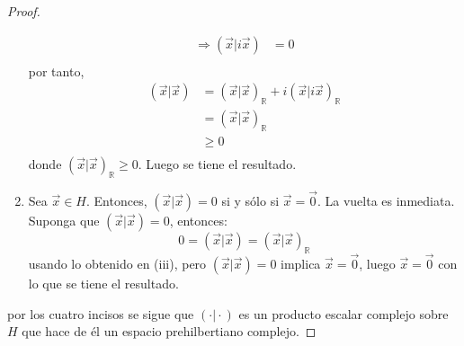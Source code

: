 \documentclass[12pt]{report}
\newcounter{it}
\theoremstyle{largebreak}
\newcommand\pint[2]{\ensuremath{\left(#1\big|#2\right)}}
\begin{document}
\begin{proof}
\begin{enumerate}
\begin{equation*}
\begin{split}
                    \Rightarrow \pint{\vec{x}}{i\vec{x}} &=0\\
                \end{split}
            \end{equation*}
            por tanto,
            \begin{equation*}
                \begin{split}
                    \pint{\vec{x}}{\vec{x}}&=\pint{\vec{x}}{\vec{x}}_{\mathbb{R}}+i\pint{\vec{x}}{i\vec{x}}_{\mathbb{R}}\\
                    &=\pint{\vec{x}}{\vec{x}}_{\mathbb{R}}\\
                    &\geq0\\
                \end{split}
            \end{equation*}
            donde $\pint{\vec{x}}{\vec{x}}_{\mathbb{R}}\geq0$. Luego se tiene el resultado.
            \item Sea $\vec{x}\in H$. Entonces, $\pint{\vec{x}}{\vec{x}}=0$ si y sólo si $\vec{x}=\vec{0}$. La vuelta es inmediata. Suponga que $\pint{\vec{x}}{\vec{x}}=0$, entonces:
            \begin{equation*}
                0=\pint{\vec{x}}{\vec{x}}=\pint{\vec{x}}{\vec{x}}_{\mathbb{R}}
            \end{equation*}
            usando lo obtenido en (iii), pero $\pint{\vec{x}}{\vec{x}}=0$ implica $\vec{x}=\vec{0}$, luego $\vec{x}=\vec{0}$ con lo que se tiene el resultado.
        \end{enumerate}
        por los cuatro incisos se sigue que $\pint{\cdot}{\cdot}$ es un producto escalar complejo sobre $H$ que hace de él un espacio prehilbertiano complejo.
    \end{proof}
\end{document}
